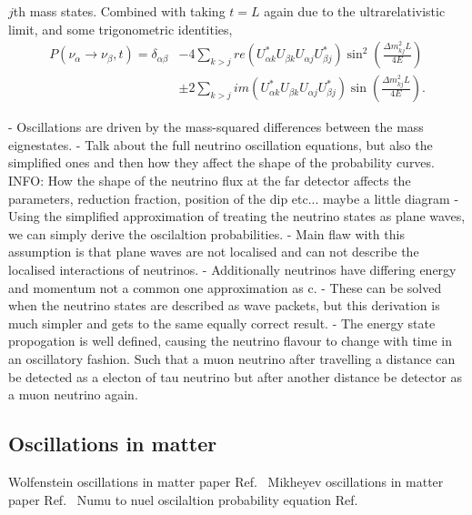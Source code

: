 $j$th mass states. Combined with taking $t = L$ again due to the ultrarelativistic limit, and some
trigonometric identities,
\begin{align} %
    P(\nu_{\alpha} \rightarrow \nu_{\beta}, t) = \delta_{\alpha\beta} & - 4\sum_{k>j}re(
    U_{\alpha k}^{*}U_{\beta k}U_{\alpha j}U_{\beta j}^{*})\sin^{2}\left(\frac{\Delta
        m_{kj}^{2}L}{4E}\right)
    \\  & \pm 2\sum_{k>j}im(
    U_{\alpha k}^{*}U_{\beta k}U_{\alpha j}U_{\beta j}^{*})\sin\left(\frac{\Delta
        m_{kj}^{2}L}{4E}\right).
    \label{eq:osc_prob}
\end{align} %

- Oscillations are driven by the mass-squared differences between the mass eignestates.
- Talk about the full neutrino oscillation equations, but also the simplified ones and then how
they affect the shape of the probability curves.
INFO: How the shape of the neutrino flux at the far detector affects the parameters, reduction
fraction, position of the dip etc... maybe a little diagram
- Using the simplified approximation of treating the neutrino states as plane waves, we can simply
derive the oscilaltion probabilities.
- Main flaw with this assumption is that plane waves are not localised and can not describe the
localised interactions of neutrinos.
- Additionally neutrinos have differing energy and momentum not a common one approximation as c.
- These can be solved when the neutrino states are described as wave packets, but this derivation
is much simpler and gets to the same equally correct result.
- The energy state propogation is well defined, causing the neutrino flavour to change with time
in an oscillatory fashion. Such that a muon neutrino after travelling a distance can be detected
as a electon of tau neutrino but after another distance be detector as a muon neutrino again.

\subsection{Oscillations in matter}

Wolfenstein oscillations in matter paper Ref.~\cite{wolfenstein1978}
Mikheyev oscillations in matter paper Ref.~\cite{mikheev1986}
Numu to nuel oscilaltion probability equation Ref.~\cite{cervera2000}

